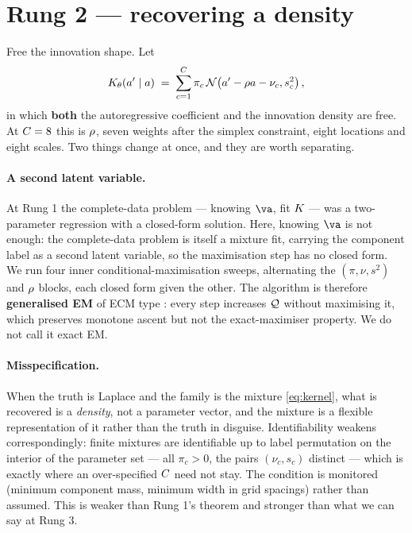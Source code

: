 \documentclass{article}
\begin{document}
\section{Rung 2 --- recovering a density}
\label{sec:rung2}

Free the innovation shape. Let
\begin{equation}
\label{eq:kernel}
K_{\theta}(a'\mid a) \;=\; \sum_{c=1}^{C} \pi_c \,
\mathcal{N}\!\left(a' - \rho a - \nu_c,s_c^2\right),
\end{equation}
in which \textbf{both} the autoregressive coefficient and the innovation density are free. At
$C=8$ this is $\rho$, seven weights after the simplex constraint, eight locations and eight
scales. Two things change at once, and they are worth separating.

\paragraph{A second latent variable.} At Rung 1 the complete-data problem --- knowing $\va$, fit
$K$ --- was a two-parameter regression with a closed-form solution. Here, knowing $\va$ is
not enough: the complete-data problem is itself a mixture fit, carrying the component label as a
second latent variable, so the maximisation step has no closed form. We run four inner
conditional-maximisation sweeps, alternating the $(\pi,\nu,s^2)$ and $\rho$ blocks, each closed
form given the other. The algorithm is therefore \textbf{generalised EM} of ECM type
\citep{dempster1977,meng1993}: every step increases $\mathcal{Q}$ without maximising it, which preserves
monotone ascent \citep{wu1983} but not the exact-maximiser property. We do not call it exact EM.

\paragraph{Misspecification.} When the truth is Laplace and the family is the mixture
\eqref{eq:kernel}, what is recovered is a \emph{density}, not a parameter vector, and the mixture
is a flexible representation of it rather than the truth in disguise. Identifiability weakens
correspondingly: finite mixtures are identifiable up to label permutation on the interior of the
parameter set --- all $\pi_c>0$, the pairs $(\nu_c,s_c)$ distinct \citep{teicher1963,yakowitz1968}
--- which is exactly where an over-specified $C$ need not stay. The condition is monitored
(minimum component mass, minimum width in grid spacings) rather than assumed. This is weaker than
Rung 1's theorem and stronger than what we can say at Rung 3.
\end{document}
